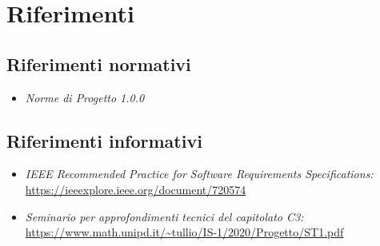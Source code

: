 \section{Riferimenti}\label{IntroduzioneRiferimenti}
\subsection{Riferimenti normativi}\label{IntroduzioneRiferimentiRiferimentiNormativi}
\begin{itemize}
	\item \textit{Norme di Progetto 1.0.0}
\end{itemize}
\subsection{Riferimenti informativi}\label{IntroduzioneRiferimentiRiferimentiInformativi}
\begin{itemize}
	\item \textit{IEEE Recommended Practice for Software Requirements Specifications:}\\
	\url{https://ieeexplore.ieee.org/document/720574}
	\item \textit{Seminario per approfondimenti tecnici del capitolato C3:}\\
	\url{https://www.math.unipd.it/~tullio/IS-1/2020/Progetto/ST1.pdf}		
\end{itemize}